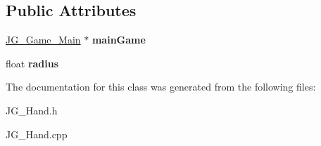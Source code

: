 \subsection*{Public Attributes}
\begin{DoxyCompactItemize}
\item 
\hypertarget{class_j_g___hand_aaec58a973d275eddd40311f14177461b}{\hyperlink{class_j_g___game___main}{J\-G\-\_\-\-Game\-\_\-\-Main} $\ast$ {\bfseries main\-Game}}\label{class_j_g___hand_aaec58a973d275eddd40311f14177461b}

\item 
\hypertarget{class_j_g___hand_abbebb5b5f2b897af0fa566477c817c96}{float {\bfseries radius}}\label{class_j_g___hand_abbebb5b5f2b897af0fa566477c817c96}

\end{DoxyCompactItemize}


The documentation for this class was generated from the following files\-:\begin{DoxyCompactItemize}
\item 
J\-G\-\_\-\-Hand.\-h\item 
J\-G\-\_\-\-Hand.\-cpp\end{DoxyCompactItemize}

